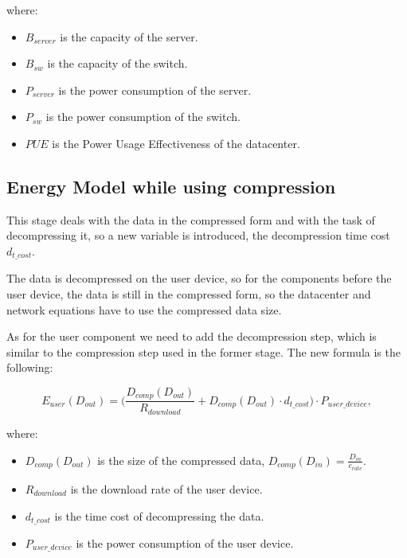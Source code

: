     \noindent where:
    \begin{itemize}
        \item $B_{server}$ is the capacity of the server.
        \item $B_{sw}$ is the capacity of the switch.
        \item $P_{server}$ is the power consumption of the server.
        \item $P_{sw}$ is the power consumption of the switch.
        \item $PUE$ is the Power Usage Effectiveness of the datacenter.
    \end{itemize}

\subsection{Energy Model while using compression}

    This stage deals with the data in the compressed form and with the task of decompressing it, so a new variable is introduced, the decompression time cost $d_{t\_cost}$.
    
    The data is decompressed on the user device, so for the components before the user device, the data is still in the compressed form, so the datacenter and network equations have to use the compressed data size.

    As for the user component we need to add the decompression step, which is similar to the compression step used in the former stage. The new formula is the following:

    \begin{equation}
        \label{formula:download_user_energy_compressed}
        E_{user}(D_{out}) = \bigg( \frac{D_{comp}(D_{out})}{R_{download}} + D_{comp}(D_{out}) \cdot d_{t\_cost} \bigg) \cdot P_{user\_device},
    \end{equation}

    \noindent where:
    \begin{itemize}
        \item $D_{comp}(D_{out})$ is the size of the compressed data, $D_{comp}(D_{in}) = \frac{D_{in}}{c_{rate}}$.
        \item $R_{download}$ is the download rate of the user device.
        \item $d_{t\_cost}$ is the time cost of decompressing the data.
        \item $P_{user\_device}$ is the power consumption of the user device.
    \end{itemize}


